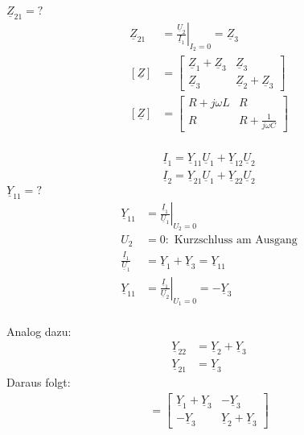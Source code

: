$\underline{Z}_{21}=?$\\
\begin{align}
	\underline{Z}_{21}&=\left.\frac{\underline{U}_2}{\underline{I}_1}\right|_{I_2=0}=\underline{Z}_3\nonumber\\
	[\underline{Z}]&=
	\begin{bmatrix}
		\underline{Z}_1+\underline{Z}_3 & \underline{Z}_3\\
		\underline{Z}_3 & \underline{Z}_2+\underline{Z}_3
	\end{bmatrix}\nonumber\\
	[\underline{Z}]&=
	\begin{bmatrix}
		R+j\omega L & R\\
		R & R+\frac{1}{j\omega C}
	\end{bmatrix}\nonumber
\end{align}
\\
\begin{align}
	\underline{I}_1=\underline{Y}_{11}\underline{U}_1+\underline{Y}_12\underline{U}_2\nonumber\\
	\underline{I}_2=\underline{Y}_{21}\underline{U}_1+\underline{Y}_22\underline{U}_2\nonumber
\end{align}
$\underline{Y}_{11}=?$\\
\begin{align}	
	\underline{Y}_{11}&=\left.\frac{\underline{I}_1}{\underline{U}_1}\right|_{U_2=0}\nonumber\\
	U_2&=0: \text{ Kurzschluss am Ausgang}\nonumber\\
	\frac{\underline{I}_1}{\underline{U}_1}&=\underline{Y}_1+\underline{Y}_3=\underline{Y}_{11}\nonumber\\
	\underline{Y}_{11}&=\left.\frac{\underline{I}_1}{\underline{U}_2}\right|_{U_1=0}=-\underline{Y}_3\nonumber
\end{align}
\\
Analog dazu:\\
\begin{align}
	\underline{Y}_{22}&=\underline{Y}_2+\underline{Y}_3\nonumber\\
	\underline{Y}_{21}&=\underline{Y}_3\nonumber
\end{align}
Daraus folgt:
\begin{align}
	[\underline{Y}]=
	\begin{bmatrix}
		\underline{Y}_1+\underline{Y}_3 & -\underline{Y}_3\\
		-\underline{Y}_3 & \underline{Y}_2+\underline{Y}_3
	\end{bmatrix}\nonumber
\end{align}
